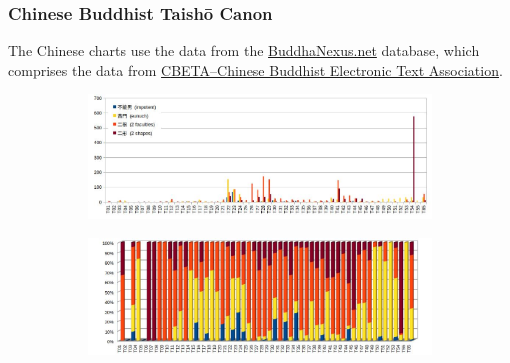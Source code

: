 \newpage
\subsubsection*{Chinese Buddhist Taishō Canon}

The Chinese charts use the data from the \href{https://buddhanexus.net}{BuddhaNexus.net} database, which comprises the data from \href{https://www.cbeta.org/}{CBETA--Chinese Buddhist Electronic Text Association}.

\begin{figure}[!h]
  \begin{subfigure}{\linewidth}
    \begin{center}
    \includegraphics[width=0.9\linewidth]{chinese.jpg}
    \end{center}
  \end{subfigure}
\setcounter{figure}{6}
\label{chinese1}
\end{figure}

\begin{figure}[!h]
  \begin{subfigure}{\linewidth}
  \begin{center}
    \includegraphics[width=0.98\linewidth]{chinese_perc.jpg}
  \end{center}
  \end{subfigure}
\setcounter{figure}{7}
\label{chinese2}
\end{figure}

